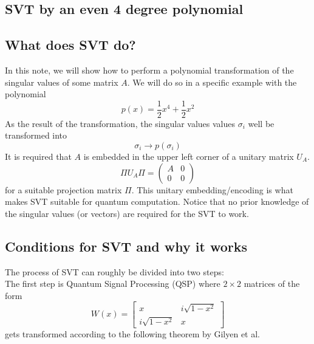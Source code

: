 \documentclass{article}
\begin{document}
\begin{center}
\section*{SVT by an even 4 degree polynomial}
\end{center}

%
%

\subsection*{What does SVT do?}
In this note, we will show how to perform a polynomial transformation of the singular values of some matrix $A$.
We will do so in a specific example with the polynomial 
$$
p(x) = \frac{1}{2}x^4 + \frac{1}{2}x^2
$$
As the result of the transformation, the singular values values $\sigma_i$ well be transformed into
$$
\sigma_i \rightarrow p(\sigma_i)
$$
It is required that $A$ is embedded in the upper left corner of a unitary matrix $U_A$. 
$$
	\Pi U_A \Pi = \begin{pmatrix} A & 0 \\ 0 & 0 \end{pmatrix}
$$
for a suitable projection matrix $\Pi$. This unitary embedding/encoding is what makes SVT suitable for quantum computation. Notice that no prior knowledge of the singular values (or vectors) are required for the SVT to work.



%
%

\subsection*{Conditions for SVT and why it works}

\noindent The process of SVT can roughly be divided into two steps: \\ 

\noindent The first step is Quantum Signal Processing (QSP) where $2\times 2$ matrices of the form
$$
W(x) = \begin{bmatrix}
x & i\sqrt{1-x^2} \\
i\sqrt{1-x^2} & x
\end{bmatrix}
$$
gets transformed according to the following theorem by Gilyen et al.\\
\end{document}
